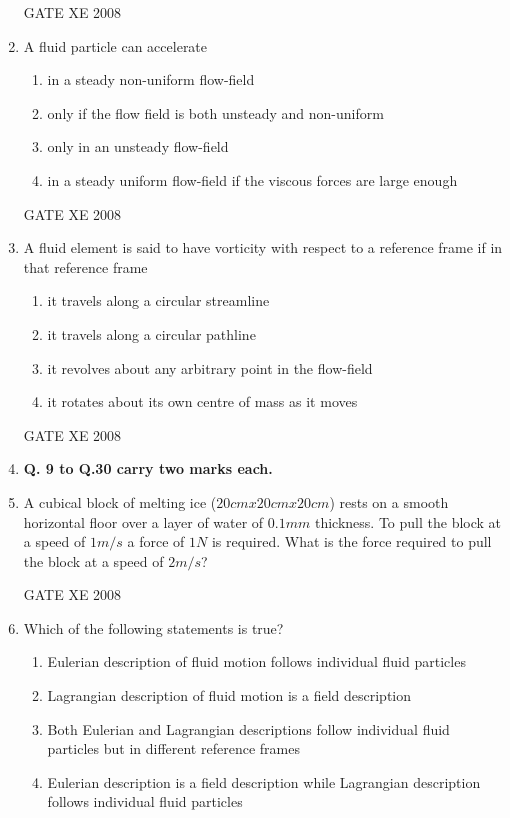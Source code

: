 \documentclass[12pt]{article}
\begin{document}
\begin{enumerate}
GATE XE 2008
\item A fluid particle can accelerate

\begin{enumerate}
\item  in a steady non-uniform flow-field
\item  only if the flow field is both unsteady and non-uniform 
\item  only in an unsteady flow-field
\item  in a steady uniform flow-field if the viscous forces are large enough
\end{enumerate}

GATE XE 2008
\item A fluid element is said to have vorticity with respect to a reference frame if in that reference frame

\begin{enumerate}
\item  it travels along a circular streamline
\item  it travels along a circular pathline
\item  it revolves about any arbitrary point in the flow-field
\item  it rotates about its own centre of mass as it moves
\end{enumerate}

GATE XE 2008
\item[] \textbf{Q. 9 to Q.30 carry two marks each.}

\item A cubical block of melting ice ($20 cm x 20 cm x 20 cm$) rests on a smooth horizontal floor over a layer of water of $0.1 mm$ thickness. To pull the block at a speed of $1 m/s$ a force of $1 N$ is required. What is the force required to pull the block at a speed of $2 m/s$?

\begin{enumerate}
\end{enumerate}

GATE XE 2008
\item  Which of the following statements is true?

\begin{enumerate}
\item  Eulerian description of fluid motion follows individual fluid particles 
\item  Lagrangian description of fluid motion is a field description 
\item  Both Eulerian and Lagrangian descriptions follow individual fluid particles but in different reference frames
\item  Eulerian description is a field description while Lagrangian description follows individual fluid particles
\end{enumerate}


\end{enumerate}
\end{document}
